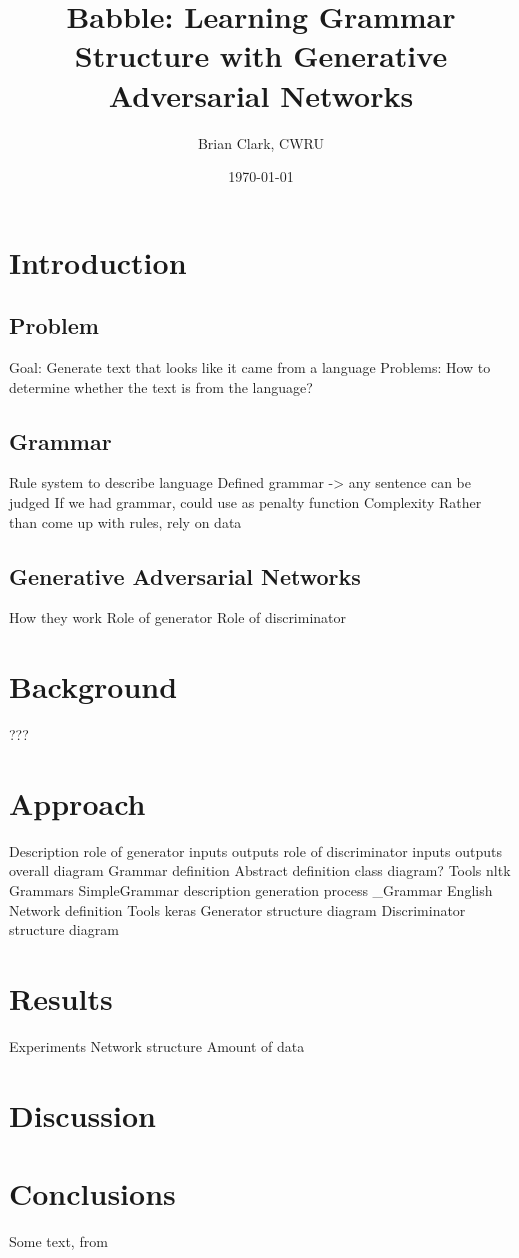 \documentclass{article}
\title{Babble: Learning Grammar Structure with Generative Adversarial Networks}
\author{Brian Clark, CWRU}
\date{\today}
\begin{document}
\maketitle
\tableofcontents


\section{Introduction}

\subsection{Problem}
Goal: Generate text that looks like it came from a language
Problems: How to determine whether the text is from the language?

\subsection{Grammar}
    Rule system to describe language
    Defined grammar -> any sentence can be judged
    If we had grammar, could use as penalty function
    Complexity
    Rather than come up with rules, rely on data

\subsection{Generative Adversarial Networks}
    How they work
    Role of generator
    Role of discriminator

\section{Background}
    ???

\section{Approach}
    Description
        role of generator
            inputs
            outputs
        role of discriminator
            inputs
            outputs
        overall diagram
    Grammar definition
        Abstract definition
            class diagram?
        Tools
            nltk
        Grammars
            SimpleGrammar
                description
                generation process
            \_Grammar
            English
    Network definition
        Tools
            keras
        Generator structure
            diagram
        Discriminator structure
            diagram

\section{Results}
    Experiments
        Network structure
        Amount of data

\section{Discussion}
\blindtext

\section{Conclusions}


Some text, from \cite{chollet2015keras}

{}

\end{document}
